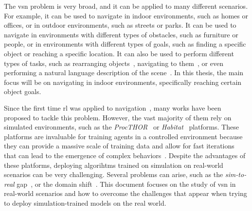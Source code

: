 The \acrshort{vsn} problem is very broad, and it can be applied to many different scenarios.
For example, it can be used to navigate in indoor environments, such as homes or offices, or in outdoor environments, such as streets or parks.
It can be used to navigate in environments with different types of obstacles, such as furniture or people, or in environments with different types of goals, such as finding a specific object or reaching a specific location.
It can also be used to perform different types of tasks, such as rearranging objects~\cite{NEURIPS2021_021bbc7e}, navigating to them~\cite{batra2020}, or even performing a natural language description of the scene~\cite{Tan2021EmbodiedSD}.
In this thesis, the main focus will be on navigating in indoor environments, specifically reaching certain object goals.

Since the first time \acrshort{rl} was applied to navigation~\cite{MAHADEVAN1992311}, many works have been proposed to tackle this problem.
However, the vast majority of them rely on simulated environments, such as the \textit{ProcTHOR}~\cite{Deitke2022ProcTHORLE} or \textit{Habitat}~\cite{NEURIPS2021_021bbc7e} platforms.
These platforms are invaluable for training agents in a controlled environment because they can provide a massive scale of training data and allow for fast iterations that can lead to the emergence of complex behaviors~\cite{Wijmans2022EmergenceOI}.
Despite the advantages of these platforms, deploying algorihtms trained on simulation on real-world scenarios can be very challenging.
Several problems can arise, such as the \textit{sim-to-real} gap~\cite{kadian2020}, or the domain shift~\cite{kim2022}.
This document focuses on the study of \acrshort{vsn} in real-world scenarios and how to overcome the challenges that appear when trying to deploy simulation-trained models on the real world.

